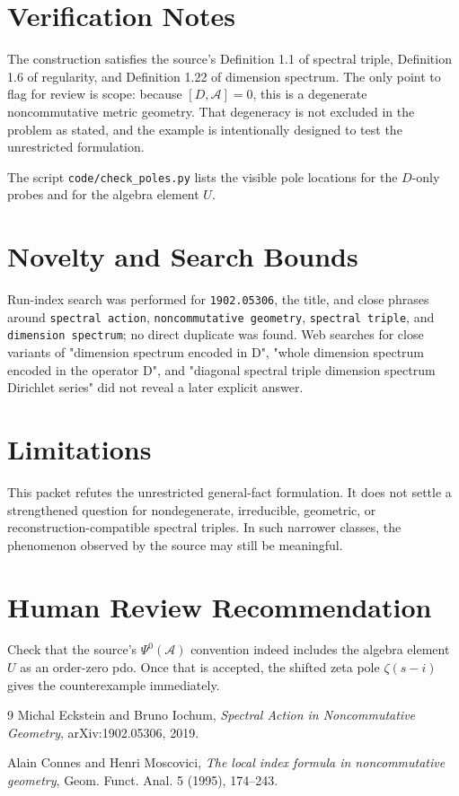 \documentclass[11pt]{article}
\newcommand{\Alg}{\mathcal{A}}
\begin{document}
\section*{Verification Notes}

The construction satisfies the source's Definition 1.1 of spectral triple,
Definition 1.6 of regularity, and Definition 1.22 of dimension spectrum.  The
only point to flag for review is scope: because \([D,\Alg]=0\), this is a
degenerate noncommutative metric geometry.  That degeneracy is not excluded in
the problem as stated, and the example is intentionally designed to test the
unrestricted formulation.

The script \texttt{code/check\_poles.py} lists the visible pole locations for
the \(D\)-only probes and for the algebra element \(U\).

\section*{Novelty and Search Bounds}

Run-index search was performed for \texttt{1902.05306}, the title, and close
phrases around \texttt{spectral action}, \texttt{noncommutative geometry},
\texttt{spectral triple}, and \texttt{dimension spectrum}; no direct duplicate
was found.  Web searches for close variants of "dimension spectrum encoded in
D", "whole dimension spectrum encoded in the operator D", and "diagonal
spectral triple dimension spectrum Dirichlet series" did not reveal a later
explicit answer.

\section*{Limitations}

This packet refutes the unrestricted general-fact formulation.  It does not
settle a strengthened question for nondegenerate, irreducible, geometric, or
reconstruction-compatible spectral triples.  In such narrower classes, the
phenomenon observed by the source may still be meaningful.

\section*{Human Review Recommendation}

Check that the source's \(\Psi^0(\Alg)\) convention indeed includes the
algebra element \(U\) as an order-zero pdo.  Once that is accepted, the shifted
zeta pole \(\zeta(s-i)\) gives the counterexample immediately.

\begin{thebibliography}{9}
Michal Eckstein and Bruno Iochum,
\emph{Spectral Action in Noncommutative Geometry},
arXiv:1902.05306, 2019.

Alain Connes and Henri Moscovici,
\emph{The local index formula in noncommutative geometry},
Geom. Funct. Anal. 5 (1995), 174--243.
\end{thebibliography}
\end{document}
